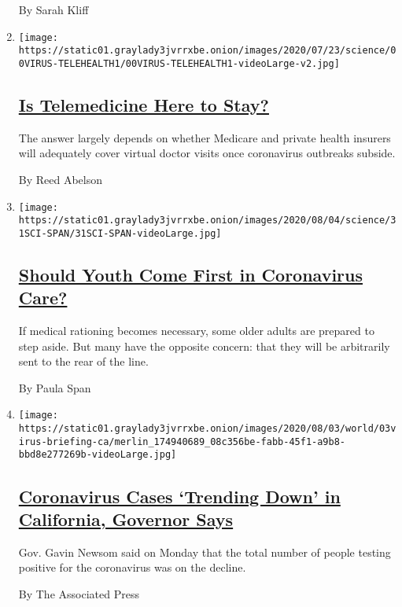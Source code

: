 \begin{enumerate}
  By Sarah Kliff
\item
  \texttt{[image: https://static01.graylady3jvrrxbe.onion/images/2020/07/23/science/00VIRUS-TELEHEALTH1/00VIRUS-TELEHEALTH1-videoLarge-v2.jpg]}

  \hypertarget{is-telemedicine-here-to-stay-1}{%
  \subsection{\texorpdfstring{\href{/2020/08/03/health/covid-telemedicine-congress.html}{Is
  Telemedicine Here to
  Stay?}}{Is Telemedicine Here to Stay?}}\label{is-telemedicine-here-to-stay-1}}

  The answer largely depends on whether Medicare and private health
  insurers will adequately cover virtual doctor visits once coronavirus
  outbreaks subside.

  By Reed Abelson
\item
  \texttt{[image: https://static01.graylady3jvrrxbe.onion/images/2020/08/04/science/31SCI-SPAN/31SCI-SPAN-videoLarge.jpg]}

  \hypertarget{should-youth-come-first-in-coronavirus-care-1}{%
  \subsection{\texorpdfstring{\href{/2020/07/31/health/coronavirus-ethics-rationing-elderly.html}{Should
  Youth Come First in Coronavirus
  Care?}}{Should Youth Come First in Coronavirus Care?}}\label{should-youth-come-first-in-coronavirus-care-1}}

  If medical rationing becomes necessary, some older adults are prepared
  to step aside. But many have the opposite concern: that they will be
  arbitrarily sent to the rear of the line.

  By Paula Span
\item
  \texttt{[image: https://static01.graylady3jvrrxbe.onion/images/2020/08/03/world/03virus-briefing-ca/merlin\_174940689\_08c356be-fabb-45f1-a9b8-bbd8e277269b-videoLarge.jpg]}

  \hypertarget{coronavirus-cases-trending-down-in-california-governor-says}{%
  \subsection{\texorpdfstring{\href{/video/us/100000007271181/california-virus-cases-trend-down.html}{Coronavirus
  Cases `Trending Down' in California, Governor
  Says}}{Coronavirus Cases `Trending Down' in California, Governor Says}}\label{coronavirus-cases-trending-down-in-california-governor-says}}

  Gov. Gavin Newsom said on Monday that the total number of people
  testing positive for the coronavirus was on the decline.

  By The Associated Press
\end{enumerate}

